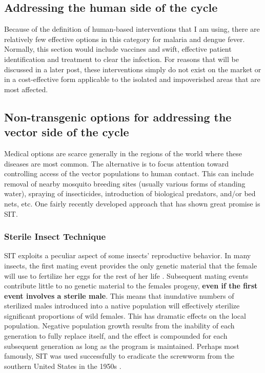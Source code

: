 \subsection{Addressing the human side of the cycle}

Because of the definition of human-based interventions that I am using, there are relatively few effective options in this category for malaria and dengue fever.
Normally, this section would include vaccines and swift, effective patient identification and treatment to clear the infection.
\alert{For reasons that will be discussed in a later post, these interventions simply do not exist on the market or in a cost-effective form applicable to the isolated and impoverished areas that are most affected.}

\subsection{Non-transgenic options for addressing the vector side of the cycle}

Medical options are scarce generally in the regions of the world where these diseases are most common.
The alternative is to focus attention toward controlling access of the vector populations to human contact.
This can include removal of nearby mosquito breeding sites (usually various forms of standing water), spraying of insecticides, introduction of biological predators, and/or bed nets, etc.
One fairly recently developed approach that has shown great promise is \gls{SIT}.



\subsubsection{Sterile Insect Technique}
\gls{SIT} exploits a peculiar aspect of some insects' reproductive behavior. 
In many insects, the first mating event provides the only genetic material that the female will use to fertilize her eggs for the rest of her life \CITEME.
Subsequent mating events contribute little to no genetic material to the females progeny, \textbf{even if the first event involves a sterile male}.
This means that inundative numbers of sterilized males introduced into a native population will effectively sterilize significant proportions of wild females.
This has dramatic effects on the local population.
Negative population growth results from the inability of each generation to fully replace itself, and the effect is compounded for each subsequent generation as long as the program is maintained.
Perhaps most famously, \gls{SIT} was used successfully to eradicate the screwworm from the southern United States in the 1950s \cite{Bushland1955}.


